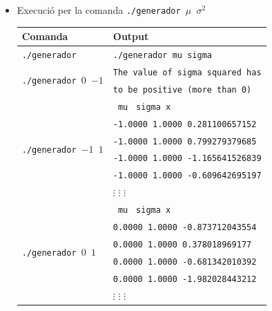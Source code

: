 \documentclass[a4paper, 11pt]{article}
\begin{document}
\begin{itemize}
    \item Execució per la comanda \texttt{./generador $\mu$ $\sigma^2$}\\
    \begin{table}[h]
            \begin{center}
            \begin{tabular}{ l | l }
            \textbf{Comanda} & \textbf{Output}\\ \hline\hline
            \texttt{./generador } & \texttt{./generador mu sigma}\\ \hline
            \multirow{2}{*}{\texttt{./generador  $0$ $-1$}} & \texttt{The value of sigma squared has} \\
            & \texttt{to be positive (more than 0)}\\ \hline
            \multirow{6}{*}{\texttt{./generador $-1$  $1$}} & \hspace{2em}\texttt{    mu} \hspace{0.2em}\texttt{  sigma            }\hspace{5.9em}\texttt{x}\\ 
            & \texttt{-1.0000 1.0000 0.281100657152}\\
            & \texttt{-1.0000 1.0000 0.799279379685}\\
            & \texttt{-1.0000 1.0000 -1.165641526839}\\
            & \texttt{-1.0000 1.0000 -0.609642695197}\\
            & \hspace{2.5em}$\vdots$ \hspace{3em}$\vdots$ \hspace{5.5em}$\vdots$\\\hline
            \multirow{6}{*}{\texttt{./generador  $0$  $1$}} & \hspace{1.5em}\texttt{    mu} \hspace{0.2em}\texttt{  sigma            }\hspace{5.9em}\texttt{x}\\ 
            & \texttt{0.0000 1.0000 -0.873712043554}\\
            & \texttt{0.0000 1.0000 0.378018969177}\\
            & \texttt{0.0000 1.0000 -0.681342010392}\\
            & \texttt{0.0000 1.0000 -1.982028443212}\\
            & \hspace{2.5em}$\vdots$ \hspace{3em}$\vdots$ \hspace{5.5em}$\vdots$\\

\end{tabular}
\end{center}
\end{table}
\end{itemize}
\end{document}
